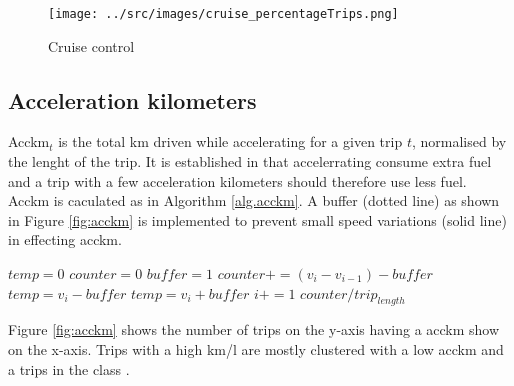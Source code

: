 \begin{figure}
\centering
\texttt{[image: ../src/images/cruise\_percentageTrips.png]}
\caption{Cruise control}
\label{fig:cruiseTrips}
\end{figure}

\subsection{Acceleration kilometers}
Acckm$_t$ is the total km driven while accelerating for a given trip $t$, normalised by the lenght of the trip. 
It is established in \cite{EcoMark} that accelerrating consume extra fuel and a trip with a few acceleration kilometers should therefore use less fuel.  
Acckm is caculated as in Algorithm \ref{alg.acckm}. 
A buffer (dotted line) as shown in Figure \ref{fig:acckm} is implemented to prevent small speed variations (solid line) in effecting acckm.

\begin{algorithm}
\caption{$acckm$}\label{alg.acckm}
\begin{algorithmic}[1]
\State $temp = 0$
\State $counter = 0$
\State $buffer = 1$ %
	\State $counter += (v_i - v_{i-1}) - buffer$
	\State $temp = v_i - buffer$
	\State $temp = v_i + buffer$
\EndIf
\State $i+=1$
\EndWhile
\State \Return $ counter / trip_{length}$

\end{algorithmic}
\end{algorithm}

Figure \ref{fig:acckm} shows the number of trips on the y-axis having a acckm show on the x-axis. 
Trips with a high km/l are mostly clustered with a low acckm and a trips in the \fuelMedium class . 

